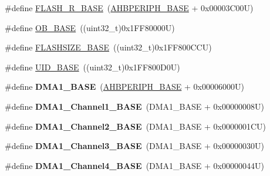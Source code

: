 \begin{DoxyCompactItemize}
\item 
\#define \hyperlink{group___peripheral__memory__map_ga8e21f4845015730c5731763169ec0e9b}{F\-L\-A\-S\-H\-\_\-\-R\-\_\-\-B\-A\-S\-E}~(\hyperlink{group___peripheral__memory__map_ga92eb5d49730765d2abd0f5b09548f9f5}{A\-H\-B\-P\-E\-R\-I\-P\-H\-\_\-\-B\-A\-S\-E} + 0x00003\-C00\-U)
\item 
\#define \hyperlink{group___peripheral__memory__map_gab5b5fb155f9ee15dfb6d757da1adc926}{O\-B\-\_\-\-B\-A\-S\-E}~((uint32\-\_\-t)0x1\-F\-F80000\-U)
\item 
\#define \hyperlink{group___peripheral__memory__map_ga776d985f2d4d40b588ef6ca9d573af78}{F\-L\-A\-S\-H\-S\-I\-Z\-E\-\_\-\-B\-A\-S\-E}~((uint32\-\_\-t)0x1\-F\-F800\-C\-C\-U)
\item 
\#define \hyperlink{group___peripheral__memory__map_ga664eda42b83c919b153b07b23348be67}{U\-I\-D\-\_\-\-B\-A\-S\-E}~((uint32\-\_\-t)0x1\-F\-F800\-D0\-U)
\item 
\hypertarget{group___peripheral__memory__map_gab2d8a917a0e4ea99a22ac6ebf279bc72}{\#define {\bfseries D\-M\-A1\-\_\-\-B\-A\-S\-E}~(\hyperlink{group___peripheral__memory__map_ga92eb5d49730765d2abd0f5b09548f9f5}{A\-H\-B\-P\-E\-R\-I\-P\-H\-\_\-\-B\-A\-S\-E} + 0x00006000\-U)}\label{group___peripheral__memory__map_gab2d8a917a0e4ea99a22ac6ebf279bc72}

\item 
\hypertarget{group___peripheral__memory__map_ga888dbc1608243badeb3554ffedc7364c}{\#define {\bfseries D\-M\-A1\-\_\-\-Channel1\-\_\-\-B\-A\-S\-E}~(D\-M\-A1\-\_\-\-B\-A\-S\-E + 0x00000008\-U)}\label{group___peripheral__memory__map_ga888dbc1608243badeb3554ffedc7364c}

\item 
\hypertarget{group___peripheral__memory__map_ga38a70090eef3687e83fa6ac0c6d22267}{\#define {\bfseries D\-M\-A1\-\_\-\-Channel2\-\_\-\-B\-A\-S\-E}~(D\-M\-A1\-\_\-\-B\-A\-S\-E + 0x0000001\-C\-U)}\label{group___peripheral__memory__map_ga38a70090eef3687e83fa6ac0c6d22267}

\item 
\hypertarget{group___peripheral__memory__map_ga70b3d9f36ca9ce95b4e421c11154fe5d}{\#define {\bfseries D\-M\-A1\-\_\-\-Channel3\-\_\-\-B\-A\-S\-E}~(D\-M\-A1\-\_\-\-B\-A\-S\-E + 0x00000030\-U)}\label{group___peripheral__memory__map_ga70b3d9f36ca9ce95b4e421c11154fe5d}

\item 
\hypertarget{group___peripheral__memory__map_ga1adc93cd0baf0897202c71110e045692}{\#define {\bfseries D\-M\-A1\-\_\-\-Channel4\-\_\-\-B\-A\-S\-E}~(D\-M\-A1\-\_\-\-B\-A\-S\-E + 0x00000044\-U)}\label{group___peripheral__memory__map_ga1adc93cd0baf0897202c71110e045692}


\end{DoxyCompactItemize}
